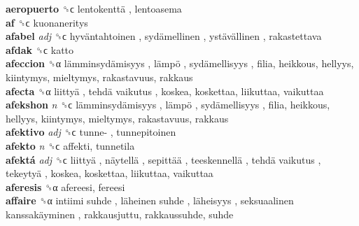 \textbf{aeropuerto} ␝ϲ   lentokenttä , lentoasema  \\
\textbf{af} ␝ϲ  kuonaneritys  \\
\textbf{afabel} \emph{adj}  ␝ϲ   hyväntahtoinen ,  sydämellinen ,  ystävällinen , rakastettava  \\
\textbf{afdak} ␝ϲ  katto  \\
\textbf{afeccion} ␝α   lämminsydämisyys ,  lämpö ,  sydämellisyys , filia, heikkous, hellyys, kiintymys, mieltymys, rakastavuus, rakkaus  \\
\textbf{afecta} ␝α   liittyä ,  tehdä vaikutus , koskea, koskettaa, liikuttaa, vaikuttaa  \\
\textbf{afekshon} \emph{n}  ␝ϲ   lämminsydämisyys ,  lämpö ,  sydämellisyys , filia, heikkous, hellyys, kiintymys, mieltymys, rakastavuus, rakkaus  \\
\textbf{afektivo} \emph{adj}  ␝ϲ   tunne- , tunnepitoinen  \\
\textbf{afekto} \emph{n}  ␝ϲ  affekti, tunnetila  \\
\textbf{afektá} \emph{adj}  ␝ϲ   liittyä ,  näytellä ,  sepittää ,  teeskennellä ,  tehdä vaikutus ,  tekeytyä , koskea, koskettaa, liikuttaa, vaikuttaa  \\
\textbf{aferesis} ␝α  afereesi, fereesi  \\
\textbf{affaire} ␝α   intiimi suhde ,  läheinen suhde ,  läheisyys ,  seksuaalinen kanssakäyminen , rakkausjuttu, rakkaussuhde, suhde  \\
